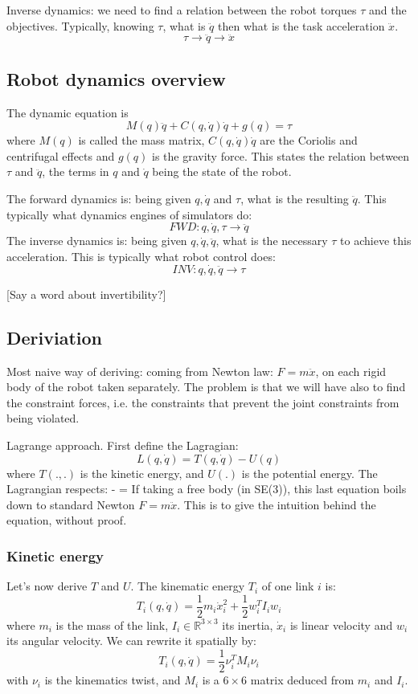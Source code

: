 \documentclass{book}
\begin{document}
Inverse dynamics: we need to find a relation between the robot torques $\tau$ and the objectives. Typically, knowing $\tau$, what is $\ddot q$ then what is the task acceleration $\ddot x$.
$$\tau \rightarrow \ddot q \rightarrow \ddot x $$

\subsection{Robot dynamics overview}
The dynamic equation is 
$$ M(q) \ddot q + C(q,\dot q)\dot q + g(q) = \tau $$ where $M(q)$ is called the
mass matrix, $C(q,\dot q) \dot q$ are the Coriolis and centrifugal effects and
$g(q)$ is the gravity force. This states the relation between $\tau$ and $\ddot
q$, the terms in $q$ and $\dot q$ being the state of the robot.

The forward dynamics is: being given $q,\dot q$ and $\tau$, what is the resulting $\ddot q$. This typically what dynamics engines of simulators do:
$$ FWD: q,\dot q,\tau \rightarrow \ddot q$$
The inverse dynamics is: being given $q,\dot q,\ddot q$, what is the necessary $\tau$ to achieve this acceleration. This is typically what robot control does:
$$ INV: q,\dot q,\ddot q \rightarrow \tau$$

[Say a word about invertibility?]

\subsection{Deriviation}
Most naive way of deriving: coming from Newton law: $F = m \ddot x$, on each rigid body of the robot taken separately. The problem is that we will have also to find the constraint forces, i.e. the constraints that prevent the joint constraints from being violated.

Lagrange approach. First define the Lagragian:
$$L(q,\dot q) = T(q,\dot q) - U(q)$$
where $T(.,.)$ is the kinetic energy, and $U(.)$ is the potential energy. The Lagrangian respects:
  -  = \tau
\EOUT
If taking a free body (in SE(3)), this last equation boils down to standard Newton $F= m \ddot x$. This is to give the intuition behind the equation, without proof.

\subsubsection{Kinetic energy}
Let's now derive $T$ and $U$. The kinematic energy $T_i$ of one link $i$ is:
$$T_i(q,\dot q) = \frac{1}{2} m_i \dot x_i^2 + \frac{1}{2} w_i^T I_i w_i$$
where $m_i$ is the mass of the link, $I_i \in \mathbb{R}^{3\times 3}$ its inertia, $\dot x_i$ is linear velocity and $w_i$ its angular velocity. We can rewrite it spatially by:
$$T_i(q,\dot q) = \frac{1}{2} \nu_i^T M_i \nu_i$$
with $\nu_i$ is the kinematics twist, and $M_i$ is a $6 \times 6$ matrix deduced from $m_i$ and $I_i$. 
\end{document}
